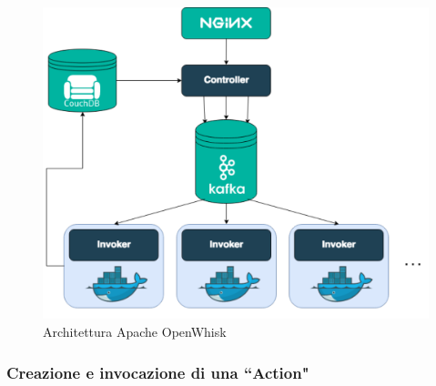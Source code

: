 \documentclass[12pt,a4paper,openany,twoside]{book}
\begin{document}
\begin{figure}[h]
    \centering
    \includegraphics[width=\linewidth]{figures/OpenWhisk_schema.pdf}
    \caption{Architettura Apache OpenWhisk}
    \label{fig:architettura-apache-openWhisk}
\end{figure}

\subsubsection{Creazione e invocazione di una ``Action"}
\end{document}

